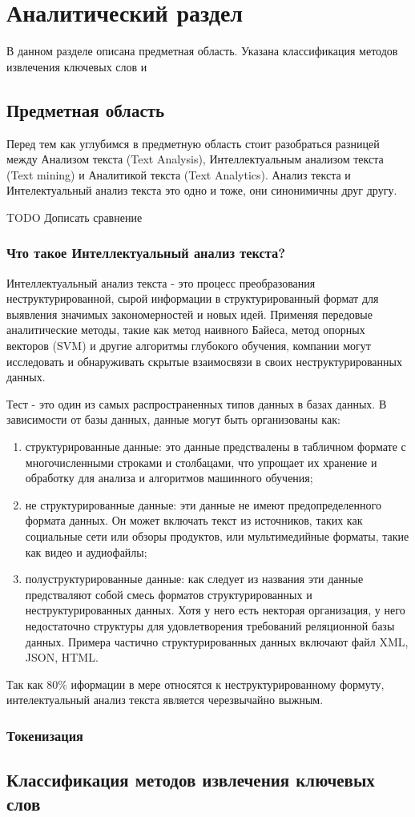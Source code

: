 \section{Аналитический раздел}
В данном разделе описана предметная область. Указана классификация методов извлечения ключевых слов и

\subsection{Предметная область}
Перед тем как углубимся в предметную область стоит разобраться разницей между Анализом текста (Text Analysis), Интеллектуальным анализом текста (Text mining) и Аналитикой текста (Text Analytics). Анализ текста и Интелектуальный анализ текста это одно и тоже, они синонимичны друг другу.

TODO Дописать сравнение

\subsubsection{Что такое Интеллектуальный анализ текста?}
Интеллектуальный анализ текста - это процесс преобразования неструктурированной, сырой информации в структурированный формат для выявления значимых закономерностей и новых идей.\cite{6}
Применяя передовые аналитические методы, такие как метод наивного Байеса, метод опорных векторов (SVM) и другие алгоритмы глубокого обучения, компании могут исследовать и обнаруживать скрытые взаимосвязи в своих неструктурированных данных.

Тест - это один из самых распространенных типов данных в базах данных.
В зависимости от базы данных, данные могут быть организованы как:
\begin{enumerate}
	\item структурированные данные: это данные предствалены в табличном формате с многочисленными строками и столбацами, что упрощает их хранение и обработку для анализа и алгоритмов машинного обучения;
	\item не структурированные данные: эти данные не имеют предопределенного формата данных. Он может включать текст из источников, таких как социальные сети или обзоры продуктов, или мультимедийные форматы, такие как видео и аудиофайлы;
	\item полуструктурированные данные: как следует из названия эти данные предстваляют собой смесь форматов структурированных и неструктурированных данных. Хотя у него есть некторая организация, у него недостаточно структуры для удовлетворения требований реляционной базы данных. Примера частично структурированных данных включают файл XML, JSON, HTML.
\end{enumerate}

Так как 80\% иформации в мере относятся к неструктурированному формуту, интелектуальный анализ текста является черезвычайно выжным.

\subsubsection{Токенизация} 


\subsection{Классификация методов извлечения ключевых слов}


